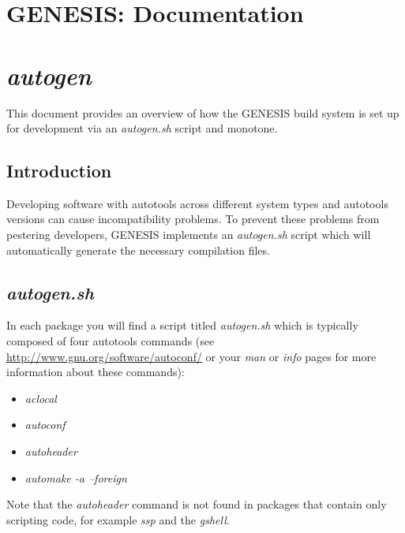 \documentclass[12pt]{article}
\begin{document}
\section*{GENESIS: Documentation}

\section*{\it autogen}

This document provides an overview of how the GENESIS build system is set up for development via an {\it autogen.sh} script and monotone.

\subsection*{Introduction}

Developing software with autotools across different system types and autotools versions can cause incompatibility problems. To prevent these problems from pestering developers, GENESIS implements an {\it autogen.sh} script which will automatically generate the necessary compilation files.

\subsection*{\it autogen.sh}

In each package you will find a script titled {\it autogen.sh} which is typically composed of four autotools commands (see \href{http://www.gnu.org/software/autoconf/}{http://www.gnu.org/software/autoconf/} or your {\it man} or {\it info} pages for more information about these commands):
\begin{itemize}
	\item {\it aclocal}
	\item {\it autoconf}
	\item {\it autoheader}
	\item {\it automake -a --foreign}
\end{itemize}
Note that the {\it autoheader} command is not found in packages that contain only scripting code, for example {\it ssp} and the {\it gshell}.
\end{document}
